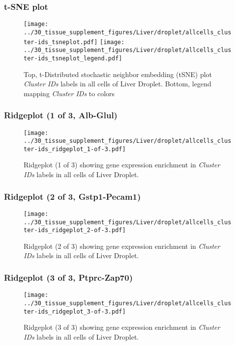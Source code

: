 \clearpage
\subsubsection{t-SNE plot}
\begin{figure}[h]
\centering
\texttt{[image: ../30\_tissue\_supplement\_figures/Liver/droplet/allcells\_cluster-ids\_tsneplot.pdf]}
\texttt{[image: ../30\_tissue\_supplement\_figures/Liver/droplet/allcells\_cluster-ids\_tsneplot\_legend.pdf]}
\caption{Top, t-Distributed stochastic neighbor embedding (tSNE) plot  \emph{Cluster IDs} labels in all cells of Liver Droplet. Bottom, legend mapping \emph{Cluster IDs} to colors}
\end{figure}


\clearpage

\subsubsection{Ridgeplot (1 of 3, Alb-Glul)}
\begin{figure}[h]
\centering
\texttt{[image: ../30\_tissue\_supplement\_figures/Liver/droplet/allcells\_cluster-ids\_ridgeplot\_1-of-3.pdf]}

\caption{ Ridgeplot (1 of 3)  showing gene expression enrichment in \emph{Cluster IDs} labels in all cells of Liver Droplet. }
\end{figure}


\clearpage

\subsubsection{Ridgeplot (2 of 3, Gstp1-Pecam1)}
\begin{figure}[h]
\centering
\texttt{[image: ../30\_tissue\_supplement\_figures/Liver/droplet/allcells\_cluster-ids\_ridgeplot\_2-of-3.pdf]}

\caption{ Ridgeplot (2 of 3)  showing gene expression enrichment in \emph{Cluster IDs} labels in all cells of Liver Droplet. }
\end{figure}


\clearpage

\subsubsection{Ridgeplot (3 of 3, Ptprc-Zap70)}
\begin{figure}[h]
\centering
\texttt{[image: ../30\_tissue\_supplement\_figures/Liver/droplet/allcells\_cluster-ids\_ridgeplot\_3-of-3.pdf]}

\caption{ Ridgeplot (3 of 3)  showing gene expression enrichment in \emph{Cluster IDs} labels in all cells of Liver Droplet. }
\end{figure}


